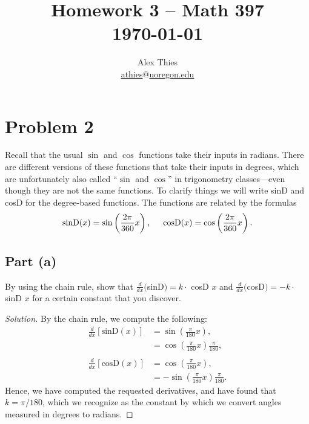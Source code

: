 \documentclass[letterpaper, 12pt]{amsart}
\theoremstyle{definition}  %
\begin{document}
	\title{Homework 3  -- Math 397 \\ \today}
	\author{Alex Thies \\ \href{mailto:athies@uoregon.edu}{\lowercase{athies$@$uoregon.edu}}}

	\maketitle

	\section*{Problem 2}
	Recall that the usual $\sin$ and $\cos$ functions take their inputs in radians. 
	There are different versions of these functions that take their inputs in degrees, which are unfortunately also called ``$\sin$ and $\cos$'' in trigonometry classes—even though they are not the same functions. 
	To clarify things we will write sinD and cosD for the degree-based functions. 
	The functions are related by the formulas
	$$\text{sinD}(x) = \sin \left(\frac{2\pi}{360} x \right), \hspace{5mm} \text{cosD}(x) = \cos \left(\frac{2\pi}{360} x \right).$$

		\subsection*{Part (a)}
		By using the chain rule, show that $\frac{d}{dx}($sinD$) = k \cdot$ cosD $x$ and $\frac{d}{dx}($cosD$) = -k \cdot$ sinD $x$ for a certain constant that you discover.

		\begin{proof}[Solution]
		By the chain rule, we compute the following:
			\begin{align*}
				\frac{d}{dx}\left[ \text{sinD}(x) \right] &= \sin\left( \frac{\pi}{180}x \right), \\
				&= \cos\left( \frac{\pi}{180}x \right)\frac{\pi}{180}, \\
				\\
				\frac{d}{dx}\left[ \text{cosD}(x) \right] &= \cos\left( \frac{\pi}{180}x \right), \\
				&= -\sin\left( \frac{\pi}{180}x \right)\frac{\pi}{180}.
			\end{align*}
		Hence, we have computed the requested derivatives, and have found that $k = \pi/180$, which we recognize as the constant by which we convert angles measured in degrees to radians.
		\end{proof}
		\pagebreak
\end{document}

